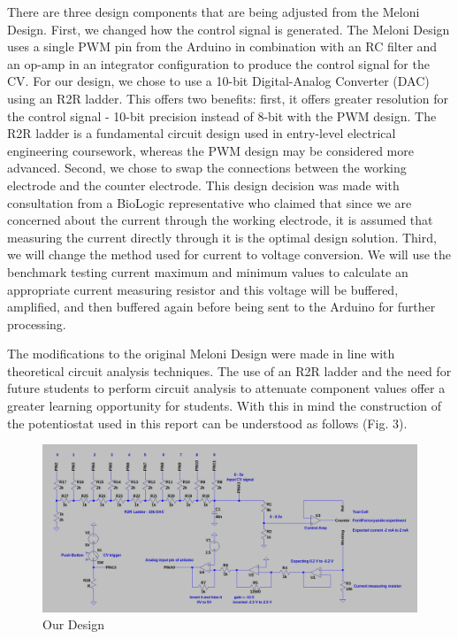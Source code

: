 \documentclass{article}
\begin{document}
There are three design components that are being adjusted from the Meloni Design. First, we changed how the control signal is generated. The Meloni Design uses a single PWM pin from the Arduino in combination with an RC filter and an op-amp in an integrator configuration to produce the control signal for the CV. For our design, we chose to use a 10-bit Digital-Analog Converter (DAC) using an R2R ladder. This offers two benefits: first, it offers greater resolution for the control signal - 10-bit precision instead of 8-bit with the PWM design. The R2R ladder is a fundamental circuit design used in entry-level electrical engineering coursework, whereas the PWM design may be considered more advanced. Second, we chose to swap the connections between the working electrode and the counter electrode. This design decision was made with consultation from a BioLogic representative who claimed that since we are concerned about the current through the working electrode, it is assumed that measuring the current directly through it is the optimal design solution. Third, we will change the method used for current to voltage conversion. We will use the benchmark testing current maximum and minimum values to calculate an appropriate current measuring resistor and this voltage will be buffered, amplified, and then buffered again before being sent to the Arduino for further processing.


The modifications to the original Meloni Design were made in line with theoretical circuit analysis techniques. The use of an R2R ladder and the need for future students to perform circuit analysis to attenuate component values offer a greater learning opportunity for students. With this in mind the construction of the potentiostat used in this report can be understood as follows (Fig. 3).


\begin{figure}[h]
\centering
\includegraphics[width=.9\linewidth]{diy_design.png}
\caption{Our Design}
\end{figure}
\end{document}
